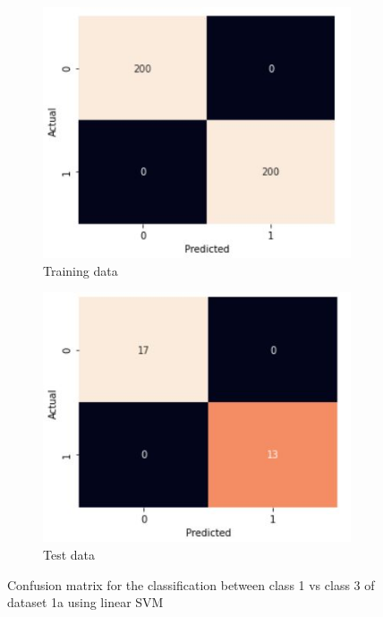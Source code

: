 \documentclass[11pt]{article}
\begin{document}
\begin{figure}[h!]
\centering
	\begin{subfigure}[b]{0.45\textwidth}
	\centering
	\includegraphics[scale=0.35]{dataset1a_linear_svm_13_cm_train.jpg}
	\caption{Training data}
	\label{fig:fig1.3.5.1}
	\end{subfigure}
	\begin{subfigure}[b]{0.45\textwidth}
	\centering
	\includegraphics[scale=0.35]{dataset1a_linear_svm_13_cm_test.jpg}
	\caption{Test data}
	\label{fig:fig1.3.5.2}
	\end{subfigure}
\caption{Confusion matrix for the classification between class 1 vs class 3 of dataset 1a using linear SVM}
\label{fig:fig1.3.5}
\end{figure}
\end{document}
